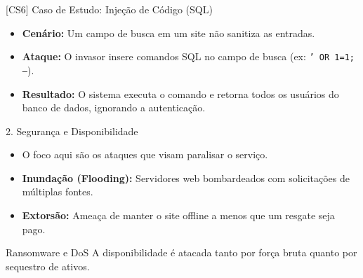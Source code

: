 \documentclass[aspectratio=169]{beamer}
\begin{document}
\begin{frame}{[CS6] Caso de Estudo: Injeção de Código (SQL)}
    \begin{itemize}
        \item \textbf{Cenário:} Um campo de busca em um site não sanitiza as entradas.
        \item \textbf{Ataque:} O invasor insere comandos SQL no campo de busca (ex: \texttt{' OR 1=1; --}).
        \item \textbf{Resultado:} O sistema executa o comando e retorna todos os usuários do banco de dados, ignorando a autenticação.
    \end{itemize}
    \centering
\end{frame}

\begin{frame}{2. Segurança e Disponibilidade}
    \begin{itemize}
        \item O foco aqui são os ataques que visam paralisar o serviço.
        \item \textbf{Inundação (Flooding):} Servidores web bombardeados com solicitações de múltiplas fontes.
        \item \textbf{Extorsão:} Ameaça de manter o site offline a menos que um resgate seja pago.
    \end{itemize}
    \begin{alertblock}{Ransomware e DoS}
        A disponibilidade é atacada tanto por força bruta quanto por sequestro de ativos.
    \end{alertblock}
\end{frame}
\end{document}
